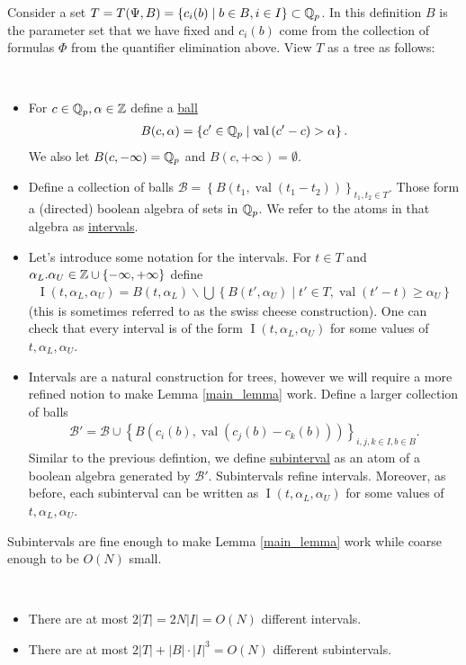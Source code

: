 \documentclass{amsart}
\newcommand{\BB}{\mathscr B}
\newcommand{\curly}[1]{\left\{#1\right\}}
\newcommand{\paren}[1]{\left(#1\right)}
\DeclareMathOperator{\vval}{val}
\DeclareMathOperator{\inti}{I}
\newcommand{\defn}{\underline}
\newcommand{\interval}{\inti(t, \alpha_L, \alpha_U)}
\begin{document}
Consider a set $T = T(\Psi, B) = \curly{c_i(b) \mid b \in B, i \in I} \subset \Q_p$.
In this definition $B$ is the parameter set that we have fixed 
and $c_i(b)$ come from the collection of formulas $\Phi$ from the quantifier elimination above.
View $T$ as a tree as follows:
\begin{Definition} \ 
  \begin{itemize}
  \item For $c \in \mathbb{Q}_p, \alpha \in \mathbb{Z}$  define a \defn{ball} 
    \begin{align*}
      B(c, \alpha) = \curly{c' \in \Q_p \mid \vval \paren{c' - c} > \alpha}.  
    \end{align*}
    We also let $B(c, -\infty) = \mathbb{Q}_p$ and $B(c, +\infty) = \emptyset$.
  \item Define a collection of balls $\BB = \curly{B(t_1, \vval(t_1 - t_2))}_{t_1, t_2 \in T}$.
    Those form a (directed) boolean algebra of sets in $\mathbb{Q}_p$.
    We refer to the atoms in that algebra as \defn{intervals}.
  \item Let's introduce some notation for the intervals.
    For $t \in T$ and $\alpha_L. \alpha_U \in \Z \cup \curly{-\infty, +\infty}$ define
    \begin{align*}
      \interval = B(t, \alpha_L) \backslash \bigcup \curly{B(t', \alpha_U) \mid t' \in T, \vval(t' - t) \geq \alpha_U}
    \end{align*}
    (this is sometimes referred to as the swiss cheese construction).
    One can check that every interval is of the form $\interval$ for some values of $t, \alpha_L, \alpha_U$.
  \item Intervals are a natural construction for trees, however we will require a more refined notion to make Lemma \ref{main_lemma} work.
    Define a larger collection of balls 
    \begin{align*}
      \BB' = \BB \cup \curly{B(c_i(b), \vval(c_j(b) - c_k(b)))}_{i,j,k \in I, b \in B}.  
    \end{align*}
    Similar to the previous defintion, we define \defn{subinterval} as an atom of a boolean algebra generated by $\BB'$.
    Subintervals refine intervals.
    Moreover, as before, each subinterval can be written as $\interval$ for some values of $t, \alpha_L, \alpha_U$.
  \end{itemize}
\end{Definition}

Subintervals are fine enough to make Lemma \ref{main_lemma} work while coarse enough to be $O(N)$ small.
\begin{Lemma} \label{interval_count}\ 
  \begin{itemize}
  \item 
    There are at most $2|T| = 2 N |I| = O(N)$ different intervals.
  \item 
    There are at most $2|T| + |B| \cdot |I|^3 = O(N)$ different subintervals.
  \end{itemize}
\end{Lemma}
\end{document}
